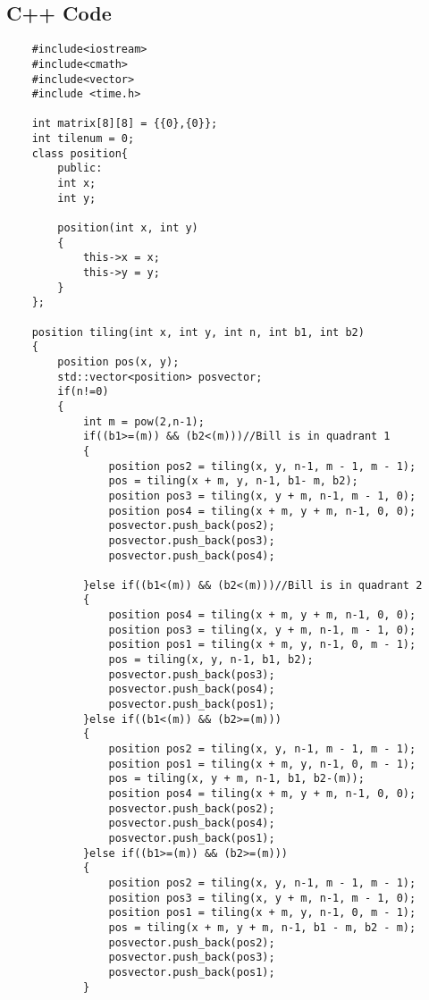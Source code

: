 \documentclass{article}
\begin{document}
    \newpage
    \subsection{C++ Code}
    \begin{lstlisting}
    #include<iostream>
    #include<cmath>
    #include<vector>
    #include <time.h>

    int matrix[8][8] = {{0},{0}};
    int tilenum = 0;
    class position{
        public:
        int x;
        int y;

        position(int x, int y)
        {
            this->x = x;
            this->y = y;
        }
    };

    position tiling(int x, int y, int n, int b1, int b2)
    {
        position pos(x, y);
        std::vector<position> posvector;
        if(n!=0)
        {
            int m = pow(2,n-1);
            if((b1>=(m)) && (b2<(m)))//Bill is in quadrant 1
            {   
                position pos2 = tiling(x, y, n-1, m - 1, m - 1);
                pos = tiling(x + m, y, n-1, b1- m, b2);
                position pos3 = tiling(x, y + m, n-1, m - 1, 0);
                position pos4 = tiling(x + m, y + m, n-1, 0, 0);
                posvector.push_back(pos2);
                posvector.push_back(pos3);
                posvector.push_back(pos4);

            }else if((b1<(m)) && (b2<(m)))//Bill is in quadrant 2
            {
                position pos4 = tiling(x + m, y + m, n-1, 0, 0);
                position pos3 = tiling(x, y + m, n-1, m - 1, 0);
                position pos1 = tiling(x + m, y, n-1, 0, m - 1);
                pos = tiling(x, y, n-1, b1, b2);
                posvector.push_back(pos3);
                posvector.push_back(pos4);
                posvector.push_back(pos1);
            }else if((b1<(m)) && (b2>=(m)))
            {
                position pos2 = tiling(x, y, n-1, m - 1, m - 1);
                position pos1 = tiling(x + m, y, n-1, 0, m - 1);
                pos = tiling(x, y + m, n-1, b1, b2-(m));
                position pos4 = tiling(x + m, y + m, n-1, 0, 0);
                posvector.push_back(pos2);
                posvector.push_back(pos4);
                posvector.push_back(pos1);
            }else if((b1>=(m)) && (b2>=(m)))
            {
                position pos2 = tiling(x, y, n-1, m - 1, m - 1);
                position pos3 = tiling(x, y + m, n-1, m - 1, 0);
                position pos1 = tiling(x + m, y, n-1, 0, m - 1);
                pos = tiling(x + m, y + m, n-1, b1 - m, b2 - m);
                posvector.push_back(pos2);
                posvector.push_back(pos3);
                posvector.push_back(pos1);
            }


\end{lstlisting}
\end{document}

